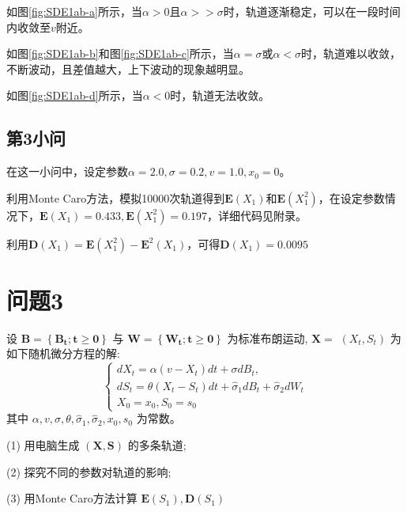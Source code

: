 \documentclass{article}
\begin{document}
如图\ref{fig:SDE1ab-a}所示，当$\alpha > 0$且$\alpha >> \sigma$时，轨道逐渐稳定，可以在一段时间内收敛至$v$附近。

如图\ref{fig:SDE1ab-b}和图\ref{fig:SDE1ab-c}所示，当$\alpha= \sigma$或$\alpha<\sigma$时，轨道难以收敛，不断波动，且差值越大，上下波动的现象越明显。

如图\ref{fig:SDE1ab-d}所示，当$\alpha < 0$时，轨道无法收敛。


\subsection{第3小问}

在这一小问中，设定参数$\alpha = 2.0, \sigma = 0.2, v = 1.0, x_0 = 0$。

利用Monte Caro方法，模拟10000次轨道得到$\boldsymbol{E}(X_1)$和$\boldsymbol{E}(X_1^2)$，在设定参数情况下，$\boldsymbol{E}(X_1) = 0.433,\boldsymbol{E}(X_1^2) = 0.197$，详细代码见附录。

利用$\boldsymbol{D}(X_1) = \boldsymbol{E}(X_1^2) - \boldsymbol{E}^2(X_1)$，可得$\boldsymbol{D}(X_1) = 0.0095$

\section{问题3}

\begin{mdframed} [%
	roundcorner=5pt,
	linecolor=gray!50,
	outerlinewidth=0.5pt,
	middlelinewidth=0.3pt, backgroundcolor=gray!2,
innertopmargin=\topskip, frametitle={问题3},
frametitlefont= \bfseries,frametitlerule=true,frametitlealignment =\raggedright\noindent,
frametitlerulewidth=.5pt, frametitlebackgroundcolor=gray!2,]
设 $\boldsymbol{B}=\left\{\boldsymbol{B}_{\boldsymbol{t}} ; \boldsymbol{t} \geq \mathbf{0}\right\}$ 与 $\boldsymbol{W}=\left\{\boldsymbol{W}_{\boldsymbol{t}} ; \boldsymbol{t} \geq \mathbf{0}\right\}$ 为标准布朗运动, $\boldsymbol{X}=$ $\left(X_t, S_t\right)$ 为如下随机微分方程的解:
$$
\left\{\begin{array}{l}
d X_t=\alpha\left(v-X_t\right) d t+\sigma d B_t, \\
d S_t=\theta\left(X_t-S_t\right) d t+\hat{\sigma}_1 d B_t+\hat{\sigma}_2 d W_t \\
X_0=x_0, S_0=s_0
\end{array}\right.
$$
其中 $\alpha, v, \sigma, \theta, \widehat{\sigma}_1, \widehat{\sigma}_2, x_0, s_0$ 为常数。

(1) 用电脑生成 $(\boldsymbol{X}, \boldsymbol{S})$ 的多条轨道;

(2) 探究不同的参数对轨道的影响;

(3) 用Monte Caro方法计算 $\boldsymbol{E}\left(S_1\right), \boldsymbol{D}\left(S_1\right)$
\end{mdframed}
\end{document}
